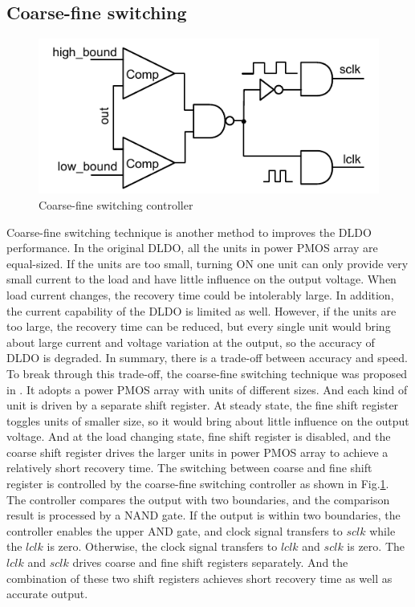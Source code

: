 \documentclass[journal]{IEEEtran}
\begin{document}
\subsection{Coarse-fine switching}
\begin{figure}[t!]
    \centering
    \includegraphics[width=\linewidth]{pic/struc/peak.pdf}
    \caption{Coarse-fine switching controller}
    \label{fig:coarse-fine}
\end{figure}
Coarse-fine switching technique is another method to improves the DLDO performance. In the original DLDO\cite{original}, all the units in power PMOS array are equal-sized. If the units are too small, turning ON one unit can only provide very small current to the load and have little influence on the output voltage. When load current changes, the recovery time could be intolerably large. In addition, the current capability of the DLDO is limited as well. However, if the units are too large, the recovery time can be reduced, but every single unit would bring about large current and voltage variation at the output, so the accuracy of DLDO is degraded. In summary, there is a trade-off between accuracy and speed. To break through this trade-off, the coarse-fine switching technique was proposed in \cite{coarse-fine}. It adopts a power PMOS array with units of different sizes. And each kind of unit is driven by a separate shift register. At steady state, the fine shift register toggles units of smaller size, so it would bring about little influence on the output voltage. And at the load changing state, fine shift register is disabled, and the coarse shift register drives the larger units in power PMOS array to achieve a relatively short recovery time. The switching between coarse and fine shift register is controlled by the coarse-fine switching controller as shown in Fig.\ref{fig:coarse-fine}. The controller compares the output with two boundaries, and the comparison result is processed by a NAND gate. If the output is within two boundaries, the controller enables the upper AND gate, and clock signal transfers to $sclk$ while the $lclk$ is zero. Otherwise, the clock signal transfers to $lclk$ and $sclk$ is zero. The $lclk$ and $sclk$ drives coarse and fine shift registers separately. And the combination of these two shift registers achieves short recovery time as well as accurate output.
\end{document}
